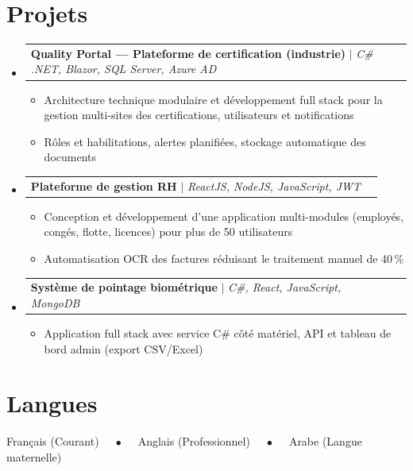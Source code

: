 \documentclass[a4paper,11pt]{article}
\makeatletter
\newcommand{\resumeItem}[1]{
  \item\small{#1}
}
\newcommand{\resumeProjectHeading}[2]{
    \item
    \begin{tabular*}{0.97\textwidth}{l@{\extracolsep{\fill}}r}
      \small#1 & #2 \\
    \end{tabular*}\vspace{-2pt}
}
\newcommand{\resumeSubHeadingListStart}{\begin{itemize}[leftmargin=0.12in, label={}, itemsep=1pt, parsep=0pt, topsep=0pt]}
\newcommand{\resumeSubHeadingListEnd}{\end{itemize}\vspace{-2pt}}
\newcommand{\resumeItemListStart}{\begin{itemize}[leftmargin=0.16in,itemsep=0pt,parsep=0pt,topsep=1pt]}
\newcommand{\resumeItemListEnd}{\end{itemize}\vspace{-1pt}}
\makeatother
\begin{document}
\section{Projets}
    \resumeSubHeadingListStart
      \resumeProjectHeading
          {\textbf{Quality Portal --- Plateforme de certification (industrie)} $|$ \emph{C\# .NET, Blazor, SQL Server, Azure AD}}{}
          \resumeItemListStart
            \resumeItem{Architecture technique modulaire et développement full stack pour la gestion multi-sites des certifications, utilisateurs et notifications}
            \resumeItem{Rôles et habilitations, alertes planifiées, stockage automatique des documents}
          \resumeItemListEnd

      \resumeProjectHeading
          {\textbf{Plateforme de gestion RH} $|$ \emph{ReactJS, NodeJS, JavaScript, JWT}}{}
          \resumeItemListStart
            \resumeItem{Conception et développement d'une application multi-modules (employés, congés, flotte, licences) pour plus de 50 utilisateurs}
            \resumeItem{Automatisation OCR des factures réduisant le traitement manuel de 40\,\%}
          \resumeItemListEnd

      \resumeProjectHeading
          {\textbf{Système de pointage biométrique} $|$ \emph{C\#, React, JavaScript, MongoDB}}{}
          \resumeItemListStart
            \resumeItem{Application full stack avec service C\# côté matériel, API et tableau de bord admin (export CSV/Excel)}
          \resumeItemListEnd

    \resumeSubHeadingListEnd


\section{Langues}
 \begin{itemize}[leftmargin=0.15in, label={}, itemsep=0pt, parsep=0pt, topsep=2pt]
    \small{\item{
     Français (Courant) $\quad\bullet\quad$ Anglais (Professionnel) $\quad\bullet\quad$ Arabe (Langue maternelle)
    }}
 \end{itemize}
\end{document}
